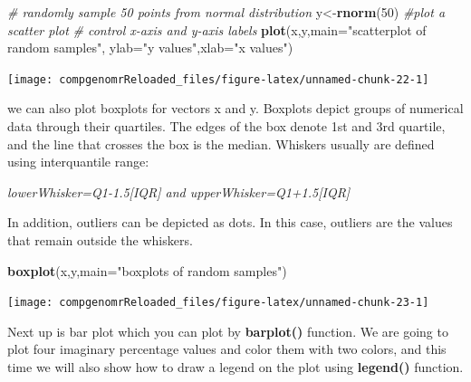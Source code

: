 \documentclass[12pt,]{krantz}
\newenvironment{Shaded}{\begin{snugshade}}{\end{snugshade}}
\newcommand{\CommentTok}[1]{\textcolor[rgb]{0.56,0.35,0.01}{\textit{#1}}}
\newcommand{\DataTypeTok}[1]{\textcolor[rgb]{0.13,0.29,0.53}{#1}}
\newcommand{\DecValTok}[1]{\textcolor[rgb]{0.00,0.00,0.81}{#1}}
\newcommand{\KeywordTok}[1]{\textcolor[rgb]{0.13,0.29,0.53}{\textbf{#1}}}
\newcommand{\NormalTok}[1]{#1}
\newcommand{\StringTok}[1]{\textcolor[rgb]{0.31,0.60,0.02}{#1}}
\begin{document}
\begin{Shaded}
\begin{Highlighting}[]
\CommentTok{# randomly sample 50 points from normal distribution}
\NormalTok{y<-}\KeywordTok{rnorm}\NormalTok{(}\DecValTok{50}\NormalTok{)}
\CommentTok{#plot a scatter plot}
\CommentTok{# control x-axis and y-axis labels}
\KeywordTok{plot}\NormalTok{(x,y,}\DataTypeTok{main=}\StringTok{"scatterplot of random samples"}\NormalTok{,}
        \DataTypeTok{ylab=}\StringTok{"y values"}\NormalTok{,}\DataTypeTok{xlab=}\StringTok{"x values"}\NormalTok{)}
\end{Highlighting}
\end{Shaded}

\begin{center}\texttt{[image: compgenomrReloaded\_files/figure-latex/unnamed-chunk-22-1]} \end{center}

we can also plot boxplots for vectors x and y. Boxplots depict groups of numerical data through their quartiles. The edges of the box denote 1st and 3rd quartile, and the line that crosses the box is the median. Whiskers usually are defined using interquantile range:

\emph{lowerWhisker=Q1-1.5{[}IQR{]} and upperWhisker=Q1+1.5{[}IQR{]}}

In addition, outliers can be depicted as dots. In this case, outliers are the values that remain outside the whiskers.

\begin{Shaded}
\begin{Highlighting}[]
 \KeywordTok{boxplot}\NormalTok{(x,y,}\DataTypeTok{main=}\StringTok{"boxplots of random samples"}\NormalTok{)}
\end{Highlighting}
\end{Shaded}

\begin{center}\texttt{[image: compgenomrReloaded\_files/figure-latex/unnamed-chunk-23-1]} \end{center}

Next up is bar plot which you can plot by \textbf{barplot()} function. We are going to plot four imaginary percentage values and color them with two colors, and this time we will also show how to draw a legend on the plot using \textbf{legend()} function.
\end{document}
